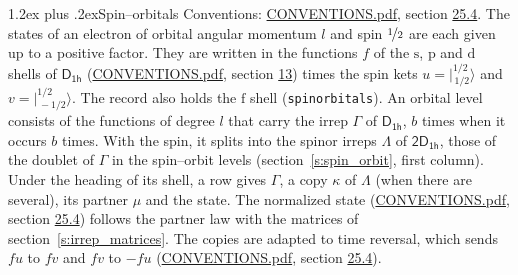 \documentclass[10pt,a4paper]{article}
\makeatletter
\renewcommand\section{\@startsection{section}{1}{\z@}{-3ex plus -1ex minus -.2ex}%
  {1.2ex plus .2ex}{\normalfont\large\sffamily\bfseries\color{parttitle}}}
\numberwithin{equation}{section}
\newcommand{\grp}[1]{\mathsf{#1}}
\newcommand{\orbital}[1]{\mathrm{#1}}
\newcommand{\mult}{\kappa}
\newcommand{\intx}{\mu}
\newcommand{\jm}[2]{\bigl\lvert{}^{#1}_{\,#2}\bigr\rangle}
\makeatother
\begin{document}
\section{Spin--orbitals}\label{s:spin_orbitals}
Conventions: \href{../../CONVENTIONS.pdf}{CONVENTIONS.pdf}, section \href{../../CONVENTIONS.pdf\#conv.25.4}{25.4}.
\leavevmode\label{n:index.orbital.l}The states of an electron of orbital angular momentum $l$ and spin $\nicefrac{1}{2}$ are each given up to a positive factor. \label{n:local.spinor.uv}\label{n:local.function.f}They are written in the functions $f$ of the $\orbital{s}$, $\orbital{p}$ and $\orbital{d}$ shells of \href{../../../rotation/data/pdf/D1h.pdf}{$\grp{D_{1h}}$} (\href{../../CONVENTIONS.pdf}{CONVENTIONS.pdf}, section \href{../../../rotation/CONVENTIONS.pdf\#conv.13}{13}) times the spin kets $u = \jm{1/2}{1/2}$ and $v = \jm{1/2}{-1/2}$. The record also holds the $\orbital{f}$ shell (\texttt{spinorbitals}). An orbital level consists of the functions of degree $l$ that carry the irrep $\Gamma$ of \href{../../../rotation/data/pdf/D1h.pdf}{$\grp{D_{1h}}$}, $b$ times when it occurs $b$ times. With the spin, it splits into the spinor irreps $\Lambda$ of $\grp{2D_{1h}}$, those of the doublet of $\Gamma$ in the spin--orbit levels (section~\ref{s:spin_orbit}, first column). \label{n:head.state}Under the heading of its shell, a row gives $\Gamma$, a copy $\mult$ of $\Lambda$ (when there are several), its partner $\intx$ and the state. The normalized state (\href{../../CONVENTIONS.pdf}{CONVENTIONS.pdf}, section \href{../../CONVENTIONS.pdf\#conv.25.4}{25.4}) follows the partner law with the matrices of section~\ref{s:irrep_matrices}. The copies are adapted to time reversal, which sends $f u$ to $f v$ and $f v$ to $-f u$ (\href{../../CONVENTIONS.pdf}{CONVENTIONS.pdf}, section \href{../../CONVENTIONS.pdf\#conv.25.4}{25.4}).
\end{document}
